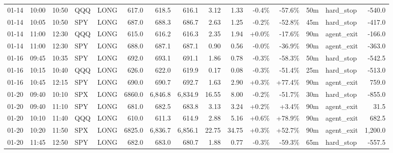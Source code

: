 \documentclass[11pt,a4paper,twoside]{article}
\begin{document}
\begin{landscape}
\begin{center}
\begin{longtable}{>{\color{txtmain}}l l l l l r r r r r r r r >{\color{txtmain}}l r}
01-14 & 10:00 & 10:50 & QQQ & LONG & 617.0 & 618.5 & 616.1 & 3.12 & 1.33 & \textcolor{lossred}{-0.4\%} & \textcolor{lossred}{-57.6\%} & 50m & hard\_stop & \textcolor{lossred}{-540.0} \\
01-14 & 10:05 & 10:50 & SPY & LONG & 687.0 & 688.3 & 686.7 & 2.63 & 1.25 & \textcolor{lossred}{-0.2\%} & \textcolor{lossred}{-52.8\%} & 45m & hard\_stop & \textcolor{lossred}{-417.0} \\
01-14 & 11:00 & 12:30 & QQQ & LONG & 615.0 & 616.2 & 616.3 & 2.35 & 1.94 & \textcolor{wingreen}{+0.0\%} & \textcolor{lossred}{-17.6\%} & 90m & agent\_exit & \textcolor{lossred}{-166.0} \\
01-14 & 11:00 & 12:30 & SPY & LONG & 688.0 & 687.1 & 687.1 & 0.90 & 0.56 & \textcolor{lossred}{-0.0\%} & \textcolor{lossred}{-36.9\%} & 90m & agent\_exit & \textcolor{lossred}{-363.0} \\
01-16 & 09:45 & 10:35 & SPY & LONG & 692.0 & 693.1 & 691.1 & 1.86 & 0.78 & \textcolor{lossred}{-0.3\%} & \textcolor{lossred}{-58.3\%} & 50m & hard\_stop & \textcolor{lossred}{-542.5} \\
01-16 & 10:15 & 10:40 & QQQ & LONG & 626.0 & 622.0 & 619.9 & 0.17 & 0.08 & \textcolor{lossred}{-0.3\%} & \textcolor{lossred}{-51.4\%} & 25m & hard\_stop & \textcolor{lossred}{-513.0} \\
01-16 & 10:45 & 12:15 & SPY & LONG & 690.0 & 690.7 & 692.7 & 1.63 & 2.90 & \textcolor{wingreen}{+0.3\%} & \textcolor{wingreen}{+77.4\%} & 90m & agent\_exit & \textcolor{wingreen}{759.0} \\
01-20 & 09:40 & 10:10 & SPX & LONG & 6860.0 & 6,846.8 & 6,834.9 & 16.55 & 8.00 & \textcolor{lossred}{-0.2\%} & \textcolor{lossred}{-51.7\%} & 30m & hard\_stop & \textcolor{lossred}{-855.0} \\
01-20 & 09:40 & 11:10 & SPY & LONG & 681.0 & 682.5 & 683.8 & 3.13 & 3.24 & \textcolor{wingreen}{+0.2\%} & \textcolor{wingreen}{+3.4\%} & 90m & agent\_exit & \textcolor{wingreen}{31.5} \\
01-20 & 10:10 & 11:40 & QQQ & LONG & 610.0 & 611.3 & 614.9 & 2.88 & 5.16 & \textcolor{wingreen}{+0.6\%} & \textcolor{wingreen}{+78.9\%} & 90m & agent\_exit & \textcolor{wingreen}{682.5} \\
01-20 & 10:20 & 11:50 & SPX & LONG & 6825.0 & 6,836.7 & 6,856.1 & 22.75 & 34.75 & \textcolor{wingreen}{+0.3\%} & \textcolor{wingreen}{+52.7\%} & 90m & agent\_exit & \textcolor{wingreen}{1,200.0} \\
01-20 & 11:45 & 12:50 & SPY & LONG & 682.0 & 683.0 & 680.7 & 1.88 & 0.77 & \textcolor{lossred}{-0.3\%} & \textcolor{lossred}{-59.3\%} & 65m & hard\_stop & \textcolor{lossred}{-557.5} \\

\end{longtable}
\end{center}
\end{landscape}
\end{document}
